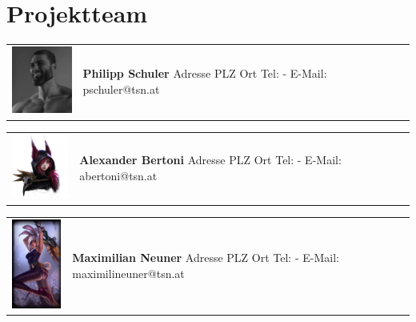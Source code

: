 \section*{Projektteam}

\begin{tabular}[t]{p{2cm} p{8cm}}
    \vspace{0pt}
    \includegraphics[width=2cm]{../images/philipp.jpg}
    &
    \vspace{0pt}
    \textbf{Philipp Schuler}
    \newline Adresse
    \newline PLZ Ort
    \newline
    \newline Tel: -
    \newline E-Mail: pschuler@tsn.at
    \\
\end{tabular}

\begin{tabular}[t]{p{2cm} p{8cm}}
    \vspace{0pt}
    \includegraphics[width=2cm]{../images/alex.png}
    &
    \vspace{0pt}
    \textbf{Alexander Bertoni}
    \newline Adresse
    \newline PLZ Ort
    \newline
    \newline Tel: -
    \newline E-Mail: abertoni@tsn.at
    \\
\end{tabular}

\begin{tabular}[t]{p{2cm} p{8cm}}
    \vspace{0pt}
    \includegraphics[width=2cm]{../images/maxi.jpg}
    &
    \vspace{0pt}
    \textbf{Maximilian Neuner}
    \newline Adresse
    \newline PLZ Ort
    \newline
    \newline Tel: -
    \newline E-Mail: maximilineuner@tsn.at
    \\
\end{tabular}

